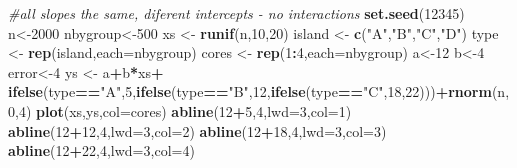 \documentclass[
]{book}
\newenvironment{Shaded}{\begin{snugshade}}{\end{snugshade}}
\newcommand{\CommentTok}[1]{\textcolor[rgb]{0.56,0.35,0.01}{\textit{#1}}}
\newcommand{\DataTypeTok}[1]{\textcolor[rgb]{0.13,0.29,0.53}{#1}}
\newcommand{\DecValTok}[1]{\textcolor[rgb]{0.00,0.00,0.81}{#1}}
\newcommand{\KeywordTok}[1]{\textcolor[rgb]{0.13,0.29,0.53}{\textbf{#1}}}
\newcommand{\NormalTok}[1]{#1}
\newcommand{\OperatorTok}[1]{\textcolor[rgb]{0.81,0.36,0.00}{\textbf{#1}}}
\newcommand{\StringTok}[1]{\textcolor[rgb]{0.31,0.60,0.02}{#1}}
\begin{document}
\begin{Shaded}
\begin{Highlighting}[]
\CommentTok{#all slopes the same, diferent intercepts - no interactions}
\KeywordTok{set.seed}\NormalTok{(}\DecValTok{12345}\NormalTok{)}
\NormalTok{n<-}\DecValTok{2000}
\NormalTok{nbygroup<-}\DecValTok{500}
\NormalTok{xs <-}\StringTok{ }\KeywordTok{runif}\NormalTok{(n,}\DecValTok{10}\NormalTok{,}\DecValTok{20}\NormalTok{)}
\NormalTok{island <-}\StringTok{ }\KeywordTok{c}\NormalTok{(}\StringTok{"A"}\NormalTok{,}\StringTok{"B"}\NormalTok{,}\StringTok{"C"}\NormalTok{,}\StringTok{"D"}\NormalTok{)}
\NormalTok{type <-}\StringTok{ }\KeywordTok{rep}\NormalTok{(island,}\DataTypeTok{each=}\NormalTok{nbygroup)}
\NormalTok{cores <-}\StringTok{ }\KeywordTok{rep}\NormalTok{(}\DecValTok{1}\OperatorTok{:}\DecValTok{4}\NormalTok{,}\DataTypeTok{each=}\NormalTok{nbygroup)}
\NormalTok{a<-}\DecValTok{12}
\NormalTok{b<-}\DecValTok{4}
\NormalTok{error<-}\DecValTok{4}
\NormalTok{ys <-}\StringTok{ }\NormalTok{a}\OperatorTok{+}\NormalTok{b}\OperatorTok{*}\NormalTok{xs}\OperatorTok{+}
\KeywordTok{ifelse}\NormalTok{(type}\OperatorTok{==}\StringTok{"A"}\NormalTok{,}\DecValTok{5}\NormalTok{,}\KeywordTok{ifelse}\NormalTok{(type}\OperatorTok{==}\StringTok{"B"}\NormalTok{,}\DecValTok{12}\NormalTok{,}\KeywordTok{ifelse}\NormalTok{(type}\OperatorTok{==}\StringTok{"C"}\NormalTok{,}\DecValTok{18}\NormalTok{,}\DecValTok{22}\NormalTok{)))}\OperatorTok{+}\KeywordTok{rnorm}\NormalTok{(n,}\DecValTok{0}\NormalTok{,}\DecValTok{4}\NormalTok{)}
\KeywordTok{plot}\NormalTok{(xs,ys,}\DataTypeTok{col=}\NormalTok{cores)}
\KeywordTok{abline}\NormalTok{(}\DecValTok{12}\OperatorTok{+}\DecValTok{5}\NormalTok{,}\DecValTok{4}\NormalTok{,}\DataTypeTok{lwd=}\DecValTok{3}\NormalTok{,}\DataTypeTok{col=}\DecValTok{1}\NormalTok{)}
\KeywordTok{abline}\NormalTok{(}\DecValTok{12}\OperatorTok{+}\DecValTok{12}\NormalTok{,}\DecValTok{4}\NormalTok{,}\DataTypeTok{lwd=}\DecValTok{3}\NormalTok{,}\DataTypeTok{col=}\DecValTok{2}\NormalTok{)}
\KeywordTok{abline}\NormalTok{(}\DecValTok{12}\OperatorTok{+}\DecValTok{18}\NormalTok{,}\DecValTok{4}\NormalTok{,}\DataTypeTok{lwd=}\DecValTok{3}\NormalTok{,}\DataTypeTok{col=}\DecValTok{3}\NormalTok{)}
\KeywordTok{abline}\NormalTok{(}\DecValTok{12}\OperatorTok{+}\DecValTok{22}\NormalTok{,}\DecValTok{4}\NormalTok{,}\DataTypeTok{lwd=}\DecValTok{3}\NormalTok{,}\DataTypeTok{col=}\DecValTok{4}\NormalTok{)}
\end{Highlighting}
\end{Shaded}
\end{document}
